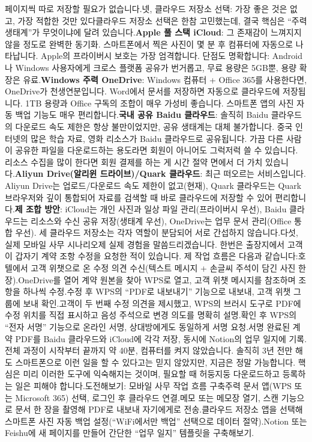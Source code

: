페이지씩 따로 저장할 필요가 없습니다.넷, 클라우드 저장소 선택: 가장 좋은 것은 없고, 가장 적합한 것만 있다클라우드 저장소 선택은 한참 고민했는데, 결국 핵심은 “주력 생태계”가 무엇이냐에 달려 있습니다.\textbf{Apple 풀 스택 iCloud}: 그 존재감이 느껴지지 않을 정도로 완벽한 동기화. 스마트폰에서 찍은 사진이 몇 분 후 컴퓨터에 자동으로 나타납니다. Apple의 프라이버시 보호는 가장 엄격합니다. 단점도 명확합니다: Android나 Windows 사용자에게 크로스 플랫폼 공유가 번거롭고, 무료 용량은 5GB뿐, 용량 확장은 유료.\textbf{Windows 주력 OneDrive}: Windows 컴퓨터 + Office 365를 사용한다면, OneDrive가 천생연분입니다. Word에서 문서를 저장하면 자동으로 클라우드에 저장됩니다. 1TB 용량과 Office 구독의 조합이 매우 가성비 좋습니다. 스마트폰 앱의 사진 자동 백업 기능도 매우 편리합니다.\textbf{국내 공유 Baidu 클라우드}: 솔직히 Baidu 클라우드의 다운로드 속도 제한은 항상 불만이었지만, 공유 생태계는 대체 불가합니다. 중국 인터넷의 많은 학습 자료, 영화 리소스가 Baidu 클라우드로 공유됩니다. 가끔 다른 사람이 공유한 파일을 다운로드하는 용도라면 회원이 아니어도 그럭저럭 쓸 수 있습니다. 리소스 수집을 많이 한다면 회원 결제를 하는 게 시간 절약 면에서 더 가치 있습니다.\textbf{Aliyun Drive(알리윈 드라이브)/Quark 클라우드}: 최근 떠오르는 서비스입니다. Aliyun Drive는 업로드/다운로드 속도 제한이 없고(현재), Quark 클라우드는 Quark 브라우저와 깊이 통합되어 자료를 검색할 때 바로 클라우드에 저장할 수 있어 편리합니다.\textbf{제 조합 방안}: iCloud는 개인 사진과 일상 파일 관리(프라이버시 우선), Baidu 클라우드는 리소스와 수신 공유 저장(생태계 우선), OneDrive는 업무 문서 관리(Office 통합 우선). 세 클라우드 저장소는 각자 역할이 분담되어 서로 간섭하지 않습니다.다섯, 실제 모바일 사무 시나리오제 실제 경험을 말씀드리겠습니다. 한번은 출장지에서 고객이 갑자기 계약 조항 수정을 요청한 적이 있습니다. 제 작업 흐름은 다음과 같습니다:호텔에서 고객 위챗으로 온 수정 의견 수신(텍스트 메시지 + 손글씨 주석이 담긴 사진 한 장).OneDrive를 열어 계약 원본을 찾아 WPS로 열고, 고객 위챗 메시지를 참조하며 조항을 하나씩 수정.수정 후 WPS의 “PDF로 내보내기” 기능으로 내보내, 고객 위챗 그룹에 보내 확인.고객이 두 번째 수정 의견을 제시했고, WPS의 브러시 도구로 PDF에 수정 위치를 직접 표시하고 음성 주석으로 변경 의도를 명확히 설명.확인 후 WPS의 “전자 서명” 기능으로 온라인 서명, 상대방에게도 동일하게 서명 요청.서명 완료된 계약 PDF를 Baidu 클라우드와 iCloud에 각각 저장, 동시에 Notion의 업무 일지에 기록.전체 과정이 시작부터 끝까지 약 40분, 컴퓨터를 켜지 않았습니다. 솔직히 3년 전만 해도 스마트폰으로 이런 일을 할 수 있다고는 믿지 않았지만, 지금은 정말 가능합니다. 핵심은 미리 이러한 도구에 익숙해지는 것이며, 필요할 때 허둥지둥 다운로드하고 등록하는 일은 피해야 합니다.도전해보기: 모바일 사무 작업 흐름 구축주력 문서 앱(WPS 또는 Microsoft 365) 선택, 로그인 후 클라우드 연결.메모 또는 메모장 열기, 스캔 기능으로 문서 한 장을 촬영해 PDF로 내보내 자기에게로 전송.클라우드 저장소 앱을 선택해 스마트폰 사진 자동 백업 설정(“WiFi에서만 백업” 선택으로 데이터 절약).Notion 또는 Feishu에 새 페이지를 만들어 간단한 “업무 일지” 템플릿을 구축해보기.
